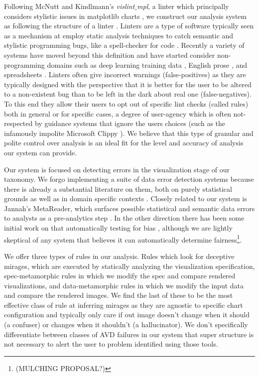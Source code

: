 Following McNutt and Kindlmann's \textit{vislint$\_$mpl}, a linter which principally considers stylistic issues in matplotlib charts \cite{Hunter:2007}, we construct our analysis system as following the structure of a linter \cite{mcnuttlinting}.
Linters are a type of software typically seen as a mechanism at employ static analysis techniques to catch semantic and stylistic programming bugs, like a spell-checker for code \cite{johnson1977lint}. Recently a variety of systems have moved beyond this definition and have started consider non-programming domains such as deep learning training data \cite{hynes2017data}, English prose \cite{proselint, writegood}, and spreadsheets \cite{barowy2018excelint}. Linters often give incorrect warnings (false-positives) as they are typically designed with the perspective that it is better for the user to be altered to a non-existent bug than to be left in the dark about real one (false-negatives). To this end they allow their users to opt out of specific lint checks (called rules) both in general or for specific cases, a degree of user-agency which is often not-respected by guidance systems that ignore the users choices (such as the infamously impolite Microsoft Clippy \cite{whitworth2005polite}). We believe that this type of granular and polite control over analysis is an ideal fit for the level and accuracy of analysis our system can provide.


Our system is focused on detecting errors in the visualization stage of our taxonomy. We forgo implementing a suite of data error detection systems because there is already a substantial literature on them, both on purely statistical grounds \cite{raman2001potter, kandel2012profiler, naumann2014data} as well as in domain specific contexts \cite{mucslu2015preventing, barowy2014checkcell}. Closely related to our system is Jannah's MetaReader, which surfaces possible statistical and semantic data errors to analysts as a pre-analytics step \cite{jannahmetareader}. In the other direction there has been some initial work on that automatically testing for bias \cite{wall2017warning}, although we are lightly skeptical of any system that believes it can automatically determine fairness\footnote{(MULCHING PROPOSAL?)}.


We offer three types of rules in our analysis. Rules which look for deceptive mirages, which are executed by statically analyzing the visualization specification, spec-metamorphic rules in which we modify the spec and compare rendered visualizations, and data-metamorphic rules in which we modify the input data and compare the rendered images. We find the last of these to be the most effective class of rule at inferring mirages as they are agnostic to specific chart configuration and typically only care if out image doesn't change when it should (a confuser) or changes when it shouldn't (a hallucinator). We don't specifically differentiate between classes of AVD failures in our system that super structure is not necessary to alert the user to problem identified using those tools.

